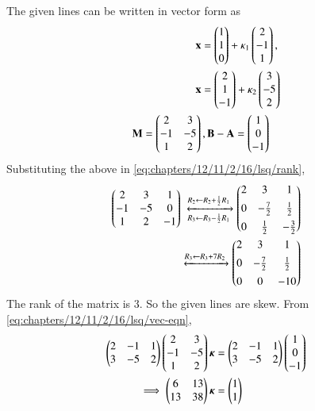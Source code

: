 		The given lines can be written  in vector form  as
\begin{align}
\begin{split}
	\mathbf{x} &= \begin{pmatrix}1\\1\\0\end{pmatrix} + \kappa_1\begin{pmatrix}2\\-1\\1\end{pmatrix},
	\\
	\mathbf{x} &= \begin{pmatrix}2\\1\\-1\end{pmatrix} + \kappa_2\begin{pmatrix}3\\-5\\2\end{pmatrix}
\end{split}
\label{eq:chapters/12/11/2/e11/lines}
\\
\begin{split}
	\mathbf{M} &= \begin{pmatrix}2&3\\-1&-5\\1&2\end{pmatrix},
\mathbf{B} - \mathbf{A} = \begin{pmatrix}1\\0\\-1\end{pmatrix}
\end{split}
\label{eq:chapters/12/11/2/e11/params}
\end{align}
%
Substituting the above in \eqref{eq:chapters/12/11/2/16/lsq/rank},
\begin{align}
\myvec{2&3&1\\-1&-5&0\\1&2&-1}
\xleftrightarrow[R_3 \leftarrow R_3 - \frac{1}{2}R_1]{R_2 \leftarrow R_2 + \frac{1}{2}R_1}
	\myvec{2&3&1\\[1ex]0&-\frac{7}{2}&\frac{1}{2}\\[1ex]0&\frac{1}{2}&-\frac{3}{2}}\\
\xleftrightarrow{R_3 \leftarrow R_3 + 7R_2}
	\myvec{2&3&1\\[1ex]0&-\frac{7}{2}&\frac{1}{2}\\[1ex]0&0&-10}
\end{align}
The rank of the matrix is 3. So the given lines are skew.
        From \eqref{eq:chapters/12/11/2/16/lsq/vec-eqn},
\begin{align}
\begin{pmatrix}2&-1&1\\3&-5&2\end{pmatrix} \begin{pmatrix}2&3\\-1&-5\\1&2\end{pmatrix}\bm{\kappa} &= \begin{pmatrix}2&-1&1\\3&-5&2\end{pmatrix} \begin{pmatrix}1\\0\\-1\end{pmatrix}\\
\implies \begin{pmatrix}6&13\\13&38\end{pmatrix}\bm{\kappa} &= \begin{pmatrix}1\\1\end{pmatrix}
\label{eq:chapters/12/11/2/e11/3}
\end{align}
